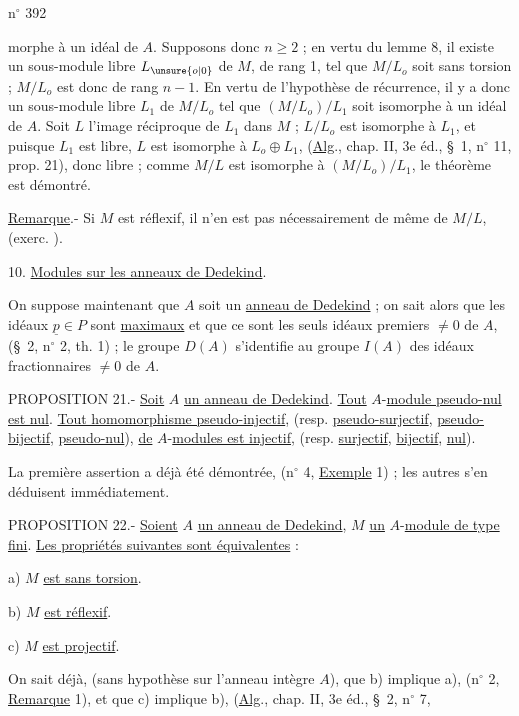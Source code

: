 \hfill n$^{\circ}$ 392

morphe à un idéal de $A$. Supposons donc $n\geq 2$ ; en vertu du lemme 8, il existe un sous-module libre $L_{\unsure{o|0}}$ de $M$, de rang 1, tel que $M/L_o$ soit sans torsion ; $M/L_o$ est donc de rang $n-1$. En vertu de l'hypothèse de récurrence, il y a donc un sous-module libre $L_1$ de $M/L_o$ tel que $(M/L_o)/L_1$ soit isomorphe à un idéal de $A$. Soit $L$ l'image réciproque de $L_1$ dans $M$ ; $L/L_o$ est isomorphe à $L_1$, et puisque $L_1$ est libre, $L$ est isomorphe à $L_o\oplus L_1$, (\uline{Alg}., chap. II, 3e éd., \S~1, n$^{\circ}$ 11, prop. 21), donc libre ; comme $M/L$ est isomorphe à $(M/L_o)/L_1$, le théorème est démontré.

\uline{Remarque}.- Si $M$ est réflexif, il n'en est pas nécessairement de même de $M/L$, (exerc. \qquad).

10. \uline{Modules sur les anneaux de Dedekind}.

On suppose maintenant que $A$ soit un \uline{anneau de Dedekind} ; on sait alors que les idéaux $\underline{p}\in P$ sont \uline{maximaux} et que ce sont les seuls idéaux premiers $\ne 0$ de $A$, (\S~2, n$^{\circ}$ 2, th. 1) ; le groupe $D(A)$ s'identifie au groupe $I(A)$ des idéaux fractionnaires $\ne 0$ de $A$.

PROPOSITION 21.- \uline{Soit} $A$ \uline{un anneau de Dedekind}. \uline{Tout} $A$-\uline{module pseudo-nul est nul}. \uline{Tout homomorphisme pseudo-injectif}, (resp. \uline{pseudo-surjectif}, \uline{pseudo-bijectif}, \uline{pseudo-nul}), \uline{de} $A$-\uline{modules est injectif}, (resp. \uline{surjectif}, \uline{bijectif}, \uline{nul}).

La première assertion a déjà été démontrée, (n$^{\circ}$ 4, \uline{Exemple} 1) ; les autres s'en déduisent immédiatement.

PROPOSITION 22.- \uline{Soient} $A$ \uline{un anneau de Dedekind}, $M$ \uline{un} $A$-\uline{module de type fini}. \uline{Les propriétés suivantes sont équivalentes} :

a) $M$ \uline{est sans torsion}.

b) $M$ \uline{est réflexif}.

c) $M$ \uline{est projectif}.

On sait déjà, (sans hypothèse sur l'anneau intègre $A$), que b) implique a), (n$^{\circ}$ 2, \uline{Remarque} 1), et que c) implique b), (\uline{Alg}., chap. II, 3e éd., \S~2, n$^{\circ}$ 7,
